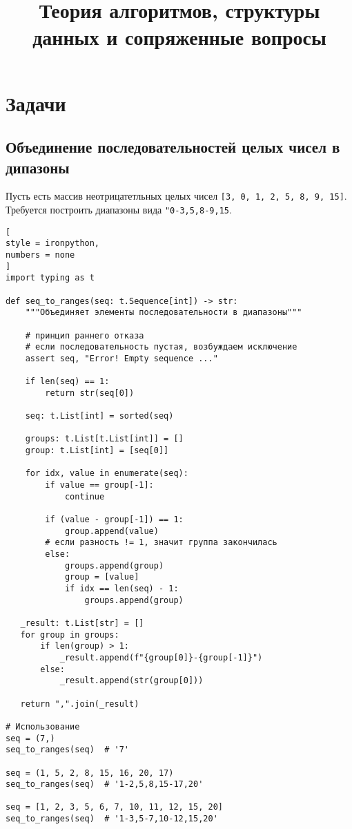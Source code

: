 \documentclass[%
	11pt,
	a4paper,
	utf8,
		]{article}
\begin{document}
\title{Теория алгоритмов, структуры данных и сопряженные вопросы}

\author{}

\date{}
\maketitle

\thispagestyle{fancy}

\tableofcontents

\section{Задачи}

\subsection{Объединение последовательностей целых чисел в дипазоны}

Пусть есть массив неотрицатетльных целых чисел \verb|[3, 0, 1, 2, 5, 8, 9, 15]|. Требуется построить диапазоны вида \verb|"0-3,5,8-9,15|.

\begin{lstlisting}[
style = ironpython,
numbers = none
]
import typing as t

def seq_to_ranges(seq: t.Sequence[int]) -> str:
    """Объединяет элементы последовательности в диапазоны"""
    
    # принцип раннего отказа
    # если последовательность пустая, возбуждаем исключение
    assert seq, "Error! Empty sequence ..."
    
    if len(seq) == 1:
        return str(seq[0])
    
    seq: t.List[int] = sorted(seq)
    
    groups: t.List[t.List[int]] = []
    group: t.List[int] = [seq[0]]
    
    for idx, value in enumerate(seq):
        if value == group[-1]:
            continue
            
        if (value - group[-1]) == 1:
            group.append(value)
        # если разность != 1, значит группа закончилась
        else:
            groups.append(group)
            group = [value]
            if idx == len(seq) - 1:
                groups.append(group)
            
   _result: t.List[str] = []
   for group in groups:
       if len(group) > 1:
           _result.append(f"{group[0]}-{group[-1]}")
       else:
           _result.append(str(group[0]))
   
   return ",".join(_result)

# Использование
seq = (7,)
seq_to_ranges(seq)  # '7'

seq = (1, 5, 2, 8, 15, 16, 20, 17)
seq_to_ranges(seq)  # '1-2,5,8,15-17,20'

seq = [1, 2, 3, 5, 6, 7, 10, 11, 12, 15, 20]
seq_to_ranges(seq)  # '1-3,5-7,10-12,15,20'
\end{lstlisting}
\end{document}

